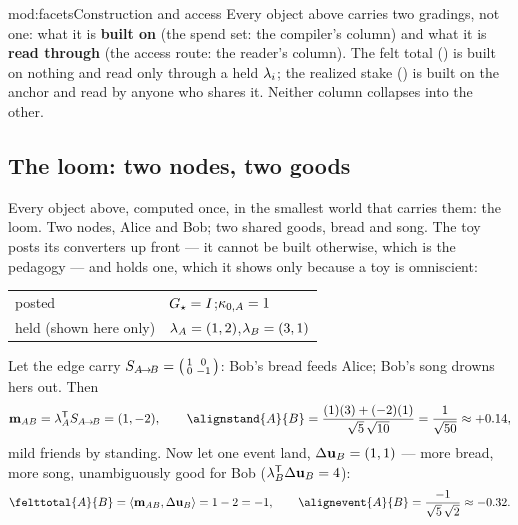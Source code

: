 \documentclass[../main]{subfiles}
\begin{document}
\begin{statement}{mod:facets}{Construction and access}
  Every object above carries two gradings, not one: what it is \textbf{built on} (the
  spend set: the compiler's column) and what it is \textbf{read through} (the access
  route: the reader's column). The felt total () is built on nothing and
  read only through a held $\lambda\sb{i}$; the realized stake () is
  built on the anchor and read by anyone who shares it. Neither column collapses into
  the other.
\end{statement}

\subsection{The loom: two nodes, two goods}
\label{subsec:ont:loom}
%
Every object above, computed once, in the smallest world that carries them:
the loom. Two nodes, Alice and Bob; two shared goods, bread and song. The toy
posts its converters up front --- it cannot be built otherwise, which is the pedagogy ---
and holds one, which it shows only because a toy is omniscient:
\begin{center}
  \begin{tabular}{ll}
    \toprule
    posted & $G\sb{\star}=I$;\quad $\kappa\sb{0,A}=1$ \\
    held (shown here only) & $\lambda\sb{A}=(1,2)$,\quad $\lambda\sb{B}=(3,1)$ \\
    \bottomrule
  \end{tabular}
\end{center}
Let the edge carry $S\sb{ A\!\to\!B }=\bigl(\begin{smallmatrix}1&0\\0&-1\end{smallmatrix}\bigr)$:
Bob's bread feeds Alice; Bob's song drowns hers out. Then
\begin{equation}
  \caringcovector{A}{B}=\selfweight{A}\transpose\comov{A}{B}=(1,-2),\qquad
  \alignstand{A}{B}=\frac{(1)(3)+(-2)(1)}{\sqrt5\,\sqrt{10}}
    =\frac{1}{\sqrt{50}}\approx+0.14,
  \label{eq:loom:standing}
\end{equation}
mild friends by standing. Now let one event land, $\Delta\mathbf{u}\sb{B}=(1,1)$ --- more
bread, more song, unambiguously good for Bob ($\lambda\sb{B}\sp{\mathsf{T}}\Delta\mathbf{u}\sb{B}=4$):
\begin{equation}
  \felttotal{A}{B}=\pairing{\caringcovector{A}{B}}{\outcomechange{B}}=1-2=-1,\qquad
  \alignevent{A}{B}=\frac{-1}{\sqrt5\,\sqrt2}\approx-0.32.
  \label{eq:loom:event}
\end{equation}
\end{document}
